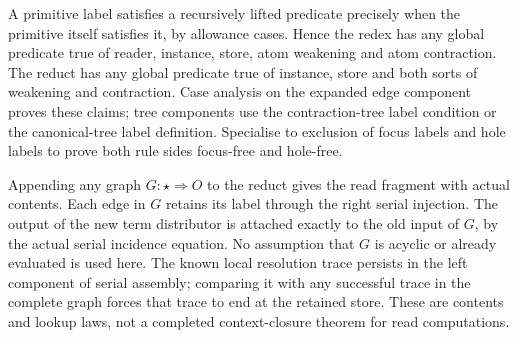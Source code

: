 






A primitive label satisfies a recursively lifted predicate precisely when
the primitive itself satisfies it, by allowance cases. Hence the redex has
any global predicate true of reader, instance, store, atom weakening and atom
contraction. The reduct has any global predicate true of instance, store and
both sorts of weakening and contraction. Case analysis on the expanded edge
component proves these claims; tree components use the contraction-tree label
condition or the canonical-tree label definition. Specialise to exclusion of
focus labels and hole labels to prove both rule sides focus-free and hole-free.






Appending any graph $G:\star\Rightarrow O$ to the reduct gives the read
fragment with actual contents. Each edge in $G$ retains its label through the
right serial injection. The output of the new term distributor is attached
exactly to the old input of $G$, by the actual serial incidence equation.
No assumption that $G$ is acyclic or already evaluated is used here. The
known local resolution trace persists in the left component of serial assembly;
comparing it with any successful trace in the complete graph forces that
trace to end at the retained store. These are contents and lookup laws, not
a completed context-closure theorem for read computations.

